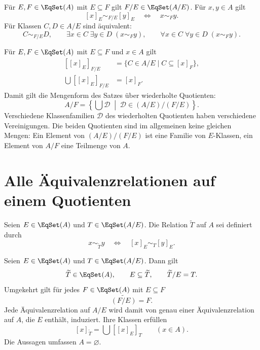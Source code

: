 \begin{theorem}
\label{b11guide:thm:quotientrelation}
Für $E,F\in\EqSet(A)$ mit $E\subseteq F$ gilt
$F/E\in\EqSet(A/E)$. Für $x,y\in A$ gilt
\[
 [x]_E\sim_{F/E}[y]_E\quad\Longleftrightarrow\quad x\sim_F y.
\]
Für Klassen $C,D\in A/E$ sind äquivalent:
\[
 C\sim_{F/E}D,\qquad
 \exists x\in C\;\exists y\in D\;(x\sim_F y),\qquad
 \forall x\in C\;\forall y\in D\;(x\sim_F y).
\]
\end{theorem}

\begin{theorem}
\label{b11guide:thm:iterated}
Für $E,F\in\EqSet(A)$ mit $E\subseteq F$ und $x\in A$ gilt
\[
\begin{aligned}
 [[x]_E]_{F/E}
   &=\{C\in A/E\mid C\subseteq[x]_F\},\\
 \bigcup [[x]_E]_{F/E}&=[x]_F.
\end{aligned}
\]
Damit gilt die Mengenform des Satzes über wiederholte Quotienten:
\[
 A/F=\left\{\bigcup\mathcal D\;\middle|\;
                     \mathcal D\in(A/E)/(F/E)\right\}.
\]
Verschiedene Klassenfamilien $\mathcal D$ des wiederholten
Quotienten haben verschiedene Vereinigungen.
Die beiden Quotienten sind im allgemeinen keine gleichen Mengen:
Ein Element von $(A/E)/(F/E)$ ist eine Familie von $E$-Klassen,
ein Element von $A/F$ eine Teilmenge von $A$.
\end{theorem}

\section{Alle Äquivalenzrelationen auf einem Quotienten}

\begin{definition}
Seien $E\in\EqSet(A)$ und $T\in\EqSet(A/E)$.
Die Relation $\widetilde T$ auf $A$ sei definiert durch
\[
 x\sim_{\widetilde T}y
 \quad\Longleftrightarrow\quad [x]_E\sim_T[y]_E.
\]
\end{definition}

\begin{theorem}
\label{b11guide:thm:correspondence}
Seien $E\in\EqSet(A)$ und $T\in\EqSet(A/E)$. Dann gilt
\[
 \widetilde T\in\EqSet(A),\qquad
 E\subseteq\widetilde T,\qquad \widetilde T/E=T.
\]
Umgekehrt gilt für jedes $F\in\EqSet(A)$ mit $E\subseteq F$
\[
 \widetilde{(F/E)}=F.
\]
Jede Äquivalenzrelation auf $A/E$ wird damit von genau einer
Äquivalenzrelation auf $A$, die $E$ enthält, induziert.
Ihre Klassen erfüllen
\[
 [x]_{\widetilde T}=\bigcup [[x]_E]_T\qquad(x\in A).
\]
Die Aussagen umfassen $A=\varnothing$.
\end{theorem}

